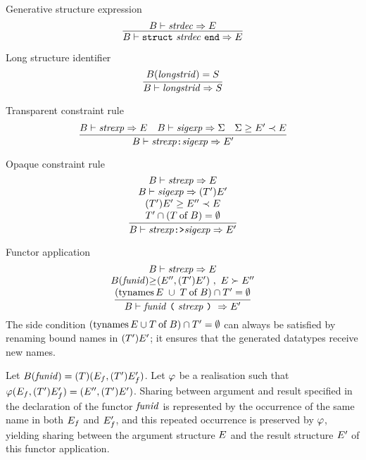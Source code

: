 
\begin{inference-rule}{Generative structure expression}
\begin{equation}\label{rule:static-modules:generative-strexp}
  \vcenter{\infer{\B\ts\encstrexp\ra \E}
    {\B\ts\strdec\ra\E}}
\end{equation}
\end{inference-rule}

\begin{inference-rule}{Long structure identifier}
\begin{equation}\label{rule:static-modules:longstrid}
  \vcenter{\infer{\B\ts\longstrid\ra\S}
    {\B(\longstrid)=\S}}
\end{equation}
\end{inference-rule}

\begin{inference-rule}{Transparent constraint rule}
\begin{equation}\label{rule:static-modules:transparent-constraint-rule}
  \vcenter{\infer{\B\ts\transpconstraint\ra\E'}
    {\B\ts\strexp\ra\E
      &\B\ts\sigexp\ra\Sigma
      &\Sigma\geq\E'\prec\E}}
\end{equation}
\end{inference-rule}

\begin{inference-rule}{Opaque constraint rule}
\begin{equation}\label{rule:static-modules:opaque-constraint-rule}
  \vcenter{\infer{\B\ts\opaqueconstraint\ra\E'}
    {\deduce{\T' \cap(\of{\T}{\B}) = \emptyset}
        {\deduce{(\T')\E'\geq\E''\prec\E}
          {\deduce{\B\ts\sigexp\ra(\T')\E'}
            {B\ts\strexp\ra\E}}}}}
\end{equation}
\end{inference-rule}

\begin{inference-rule}{Functor application}
\begin{equation}\label{rule:static-modules:functor-application}
  \vcenter{\infer{\B\ts\funappstr\ra\E'}
    {\deduce{(\TyNamesFcn \E\; \cup\; \of{\T}{\B})\cap\T'=\emptyset}
      {\deduce{\funsiginst{\B(\funid)}{}{(\E'',(\T')\E')}\ ,
                                                    \ \E\succ\E''}
        {\B\ts\strexp\ra\E}}}}
\end{equation}
The side condition $(\mathop{\rm tynames}\nolimits E \cup T \mathbin{\rm of} B)\cap T'=\emptyset$
can always be satisfied by renaming bound names in $(T')E'$; it ensures that the
generated datatypes receive new names.

Let $B(\textit{funid\/})=(T)(E_{f},(T')E'_{f})$. Let $\varphi$ be a realisation such
that $\varphi(E_{f},(T')E'_{f})=(E'',(T')E')$. Sharing between argument
and result specified in the declaration of the functor $\textit{funid\/}$ is
represented by the occurrence of the same name in both $E_{f}$ and
$E'_{f}$, and this repeated occurrence is preserved by $\varphi$, yielding
sharing between the argument structure $E$ and the result structure
$E'$ of this functor application.
\end{inference-rule}


